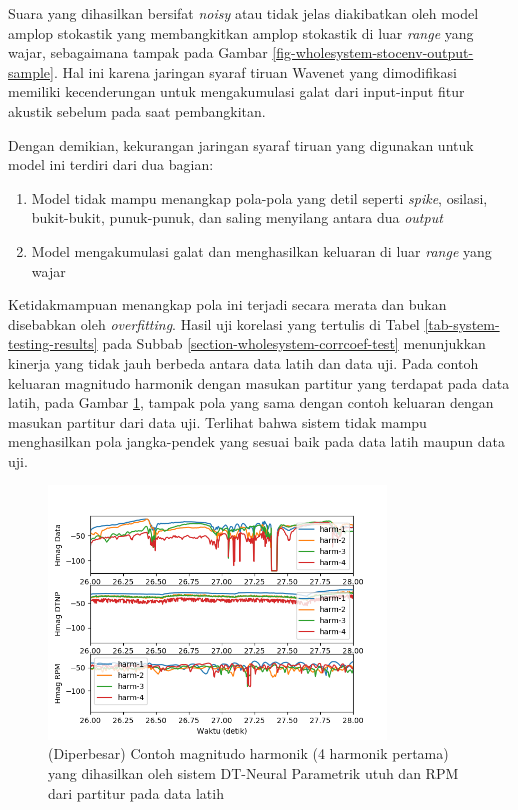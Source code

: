 Suara yang dihasilkan bersifat \textit{noisy} atau tidak jelas diakibatkan oleh model amplop stokastik yang membangkitkan amplop stokastik di luar \textit{range} yang wajar, sebagaimana tampak pada Gambar \ref{fig-wholesystem-stocenv-output-sample}. Hal ini karena jaringan syaraf tiruan Wavenet yang dimodifikasi memiliki kecenderungan untuk mengakumulasi galat dari input-input fitur akustik sebelum pada saat pembangkitan.

Dengan demikian, kekurangan jaringan syaraf tiruan yang digunakan untuk model ini terdiri dari dua bagian:
\begin{enumerate}
	\item Model tidak mampu menangkap pola-pola yang detil seperti \textit{spike}, osilasi, bukit-bukit, punuk-punuk, dan saling menyilang antara dua \textit{output}
	\item Model mengakumulasi galat dan menghasilkan keluaran di luar \textit{range} yang wajar
\end{enumerate}

Ketidakmampuan menangkap pola ini terjadi secara merata dan bukan disebabkan oleh \textit{overfitting}. Hasil uji korelasi yang tertulis di Tabel \ref{tab-system-testing-results} pada Subbab \ref{section-wholesystem-corrcoef-test} menunjukkan kinerja yang tidak jauh berbeda antara data latih dan data uji. Pada contoh keluaran magnitudo harmonik dengan masukan partitur yang terdapat pada data latih, pada Gambar \ref{fig-wholesystem-hmag-output-sample-traindata-zoomed}, tampak pola yang sama dengan contoh keluaran dengan masukan partitur dari data uji. Terlihat bahwa sistem tidak mampu menghasilkan pola jangka-pendek yang sesuai baik pada data latih maupun data uji.

\begin{figure}[htbp]
    \centering
    \includegraphics[width=0.8\textwidth]{resources/Analisis_wholesystem_Hmag_traindata_zoomed.png}
    \caption{(Diperbesar) Contoh magnitudo harmonik (4 harmonik pertama) yang dihasilkan oleh sistem DT-Neural Parametrik utuh dan RPM dari partitur pada data latih}\label{fig-wholesystem-hmag-output-sample-traindata-zoomed}
\end{figure}

